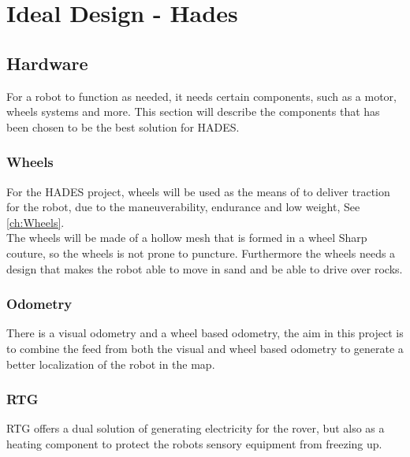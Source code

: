 \chapter{Ideal Design - Hades}\label{ch:Implementation Theory}

\section{Hardware}
For a robot to function as needed, it needs certain components, such as a motor, wheels systems and more. This section will describe the components that has been chosen to be the best solution for HADES.


\subsection{Wheels}
For the HADES project, wheels will be used as the means of to deliver traction for the robot, due to the maneuverability, endurance and low weight, See \ref{ch:Wheels}.\\
The wheels will be made of a hollow mesh that is formed in a wheel Sharp couture, so the wheels is not prone to puncture. Furthermore the wheels needs a design that makes the robot able to move in sand and be able to drive over rocks.  

\subsection{Odometry}
There is a visual odometry and a wheel based odometry, the aim in this project is to combine the feed from both the visual and wheel based odometry to generate a better localization of the robot in the map.

\subsection{RTG}
RTG offers a dual solution of generating electricity for the rover, but also as a heating component to protect the robots sensory equipment from freezing up.
